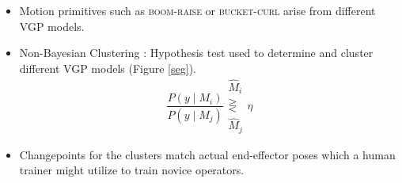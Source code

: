 \documentclass[portrait,a0paper,fontscale=0.28]{baposter} %
\begin{document}
\begin{poster}
{\begin{multicols}{2}
\begin{minipage}{.47\textwidth}
\begin{itemize}
      \end{itemize}
      \begin{itemize}
      \item Motion primitives such as \textsc{boom-raise} or
        \textsc{bucket-curl} arise from different VGP models.
      \item
        Non-Bayesian Clustering \cite{Grande14_TNN}: Hypothesis test used to determine and cluster different VGP models (Figure \ref{seg}).
        \begin{equation}\label{lrt}
          \frac{P(y \mid M_i)}{P(y \mid M_j)} \begin{array}{c} \hat M_i \\ \gtreqless \\ \hat M_j \end{array}\eta
        \end{equation}
      \item
        Changepoints for the clusters match actual end-effector poses which a human trainer might utilize to train novice operators. 
      \end{itemize}
      

\end{minipage}
\end{multicols}}
\end{poster}
\end{document}
